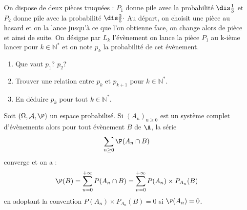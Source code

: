 \documentclass[a4paper,10pt]{report}
\begin{document}
\begin{exa} On dispose de deux pièces truquées : $P_1$ donne pile avec la probabilité $\dis \frac{1}{3}$ et $P_2$ donne pile avec la probabilité $\dis \frac{2}{5} \cdot$ Au départ, on choisit une pièce au hasard et on la lance jusqu'à ce que l'on obtienne face, on change alors de pièce et ainsi de suite. On désigne par $L_k$ l'évènement \og on lance la pièce $P_1$ au k-ième lancer \fg pour $k \in \mathbb{N}^*$ et on note $p_k$ la probabilité de cet évènement.
\begin{enumerate}
\item Que vaut $p_1$? $p_2$?
\item Trouver une relation entre $p_k$ et $p_{k+1}$ pour $k \in \mathbb{N}^*$.
\item En déduire $p_k$ pour tout $k \in \mathbb{N}^*$.
\end{enumerate}
\end{exa}

\begin{thm}
Soit $(\Omega, \mathcal{A}, \P)$ un espace probabilisé. Si $(A_n)_{n \geq 0}$ est un système complet d'évènements alors pour tout évènement $B$ de $\A$, la série 
$$ \sum_{n \geq 0} \P(A_n \cap B)$$
converge et on a :
$$ \P(B) = \sum_{n=0}^{+ \infty} P(A_n \cap B) = \sum_{n=0}^{+ \infty} P(A_n) \times P_{A_n}( B)$$
en adoptant la convention $P(A_n) \times P_{A_n}( B)=0$ si $\P(A_n)=0$.
\end{thm}
%
\end{document}
